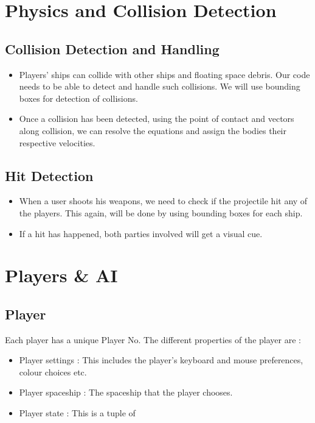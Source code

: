 \documentclass[]{article}
\begin{document}
\section{Physics and Collision Detection}
\subsection{Collision Detection and Handling}
\begin{itemize}
\item Players' ships can collide with other ships and floating space debris. Our code needs to be able to detect and handle such collisions. We will use bounding boxes for detection of collisions.
\item Once a collision has been detected, using the point of contact and vectors along collision, we can resolve the equations and assign the bodies their respective velocities.
\end{itemize}
\subsection{Hit Detection}
\begin{itemize}

\item When a user shoots his weapons, we need to check if the projectile hit any of the players. This again, will be done by using bounding boxes for each ship.
\item If a hit has happened, both parties involved will get a visual cue.
\end{itemize}
\vfill


\section{Players \& AI}
\subsection{Player}
Each player has a unique Player No. The different properties of the player are : 
\begin{itemize}
\item Player settings : This includes the player's keyboard and mouse preferences, colour choices etc.
\item Player spaceship : The spaceship that the player chooses.
\item Player state : This is a tuple of 
\end{itemize}

\end{document}
